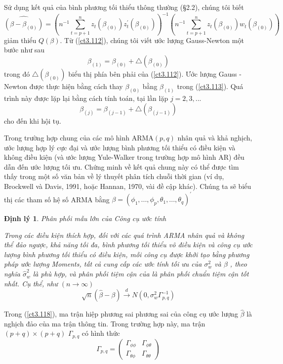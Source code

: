 \documentclass[12pt, a4paper,oneside]{book}
\newtheorem{theo}{\bf Định lý}[section]
\theoremstyle{definition}
\begin{document}
Sử dụng kết quả của bình phương tối thiểu thông thường (§2.2), chúng tôi biết
\begin{equation}
\widehat{(\beta-\beta_{(0)})}=(n^{-1}\sum_{t=p+1}^{n}z_t(\beta_{(0)})z^{\prime}_t(\beta_{(0)}))^{-1}(n^{-1}\sum_{t=p+1}^{n}z_t(\beta_{(0)})w_t(\beta_{(0)})) \label{ct3.112}
\end{equation}
giảm thiểu $ Q(\beta) $. Từ (\ref{ct3.112}), chúng tôi viết ước lượng Gauss-Newton một bước như sau
\begin{equation}
\beta_{(1)}=\beta_{(0)}+\bigtriangleup(\beta_{(0)}) \label{ct3.113}
\end{equation}
trong đó $ \bigtriangleup(\beta_{(0)}) $ biểu thị phía bên phải của (\ref{ct3.112}). Ước lượng Gauss - Newton được thực hiện bằng cách thay $ \beta_{(0)} $ bằng $ \beta_{(1)} $ trong (\ref{ct3.113}). Quá trình này được lặp lại bằng cách tính toán, tại lần lặp $ j = 2, 3,... $ 
$$ \beta_{(j)}=\beta_{(j-1)}+\bigtriangleup(\beta_{(j-1)}) $$
cho đến khi hội tụ.

Trong trường hợp chung của các mô hình ARMA$ (p, q) $ nhân quả và khả nghịch, ước lượng hợp lý cực đại và ước lượng bình phương tối thiểu có điều kiện và không điều kiện (và ước lượng Yule-Walker trong trường hợp mô hình AR) đều dẫn đến ước lượng tối ưu. Chứng minh về kết quả chung này có thể được tìm thấy trong một số văn bản về lý thuyết phân tích chuỗi thời gian (ví dụ, Brockwell và Davis, 1991, hoặc Hannan, 1970, vài đề cập khác). Chúng ta sẽ biểu thị các tham số hệ số ARMA bằng $\beta=(\phi_{1},...,\phi_{p},\theta_{1},...,\theta_{q})^{\prime} $

\begin{theo}
	Phân phối mẫu lớn của Công cụ ước tính
	
	Trong các điều kiện thích hợp, đối với các quá trình ARMA nhân quả và không thể đảo ngược, khả năng tối đa, bình phương tối thiểu vô điều kiện và công cụ ước lượng bình phương tối thiểu có điều kiện, mỗi công cụ được khởi tạo bằng phương pháp ước lượng Moments, tất cả cung cấp các ước tính tối ưu của $ \sigma_{w}^2 $ và  $ \beta $  , theo nghĩa $ \hat{\sigma}_{w}^2 $   là phù hợp, và phân phối tiệm cận của là phân phối chuẩn tiệm cận tốt nhất. Cụ thể, như $ (n \longrightarrow\infty) $
	\begin{equation}
	\sqrt{n}(\hat{\beta}-\beta) \xrightarrow{d} N(0,\sigma_{w}^2\Gamma^{-1}_{p,q}) \label{ct3.118}
	\end{equation}
	
	
\end{theo}
Trong (\ref{ct3.118}), ma trận hiệp phương sai phương sai của công cụ ước lượng $ \hat{\beta} $ là nghịch đảo của ma trận thông tin. Trong trường hợp này, ma trận $ (p + q) \times (p + q) $ $ \Gamma_{p,q} $ có hình thức
\begin{equation}
\Gamma_{p,q}= \begin{pmatrix}
\Gamma_{\phi\phi}  & \Gamma_{\phi\theta} \\
\Gamma_{\theta\phi}  & \Gamma_{\theta\theta}
\end{pmatrix} \label{ct3.119}
\end{equation}
\end{document}

